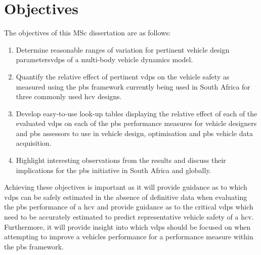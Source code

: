 \chapter{Objectives}\label{section:objectives}

The objectives of this MSc dissertation are as follows:

\begin{enumerate}\addtolength{\itemsep}{0.5\baselineskip}
\item Determine reasonable ranges of variation for pertinent vehicle design parameters\glspl{vdp} of a multi-body vehicle dynamics model.
\item Quantify the relative effect of pertinent \glspl{vdp} on the vehicle safety as measured using the \gls{pbs} framework currently being used in South Africa for three commonly used \gls{hcv} designs.
\item Develop easy-to-use look-up tables displaying the relative effect of each of the evaluated \glspl{vdp} on each of the \gls{pbs} performance measures for vehicle designers and \gls{pbs} assessors to use in vehicle design, optimisation and \gls{pbs} vehicle data acquisition.
\item Highlight interesting observations from the results and discuss their implications for the \gls{pbs} initiative in South Africa and globally.
\end{enumerate}

Achieving these objectives is important as it will provide guidance as to which \glspl{vdp} can be safely estimated in the absence of definitive data when evaluating the \gls{pbs} performance of a \gls{hcv} and provide guidance as to the critical \glspl{vdp} which need to be accurately estimated to predict representative vehicle safety of a \gls{hcv}. Furthermore, it will provide insight into which \glspl{vdp} should be focused on when attempting to improve a vehicles performance for a performance measure within the \gls{pbs} framework.